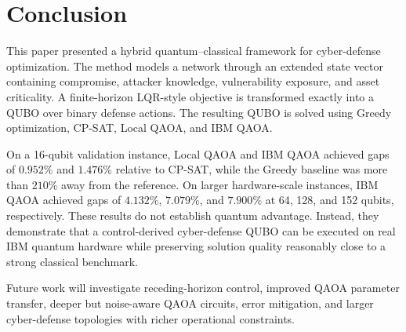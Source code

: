 \documentclass[runningheads]{llncs}
\begin{document}
\section{Conclusion}

This paper presented a hybrid quantum--classical framework for cyber-defense optimization. The method models a network through an extended state vector containing compromise, attacker knowledge, vulnerability exposure, and asset criticality. A finite-horizon LQR-style objective is transformed exactly into a QUBO over binary defense actions. The resulting QUBO is solved using Greedy optimization, CP-SAT, Local QAOA, and IBM QAOA.

On a 16-qubit validation instance, Local QAOA and IBM QAOA achieved gaps of $0.952\%$ and $1.476\%$ relative to CP-SAT, while the Greedy baseline was more than $210\%$ away from the reference. On larger hardware-scale instances, IBM QAOA achieved gaps of $4.132\%$, $7.079\%$, and $7.900\%$ at 64, 128, and 152 qubits, respectively. These results do not establish quantum advantage. Instead, they demonstrate that a control-derived cyber-defense QUBO can be executed on real IBM quantum hardware while preserving solution quality reasonably close to a strong classical benchmark.

Future work will investigate receding-horizon control, improved QAOA parameter transfer, deeper but noise-aware QAOA circuits, error mitigation, and larger cyber-defense topologies with richer operational constraints.
\end{document}
